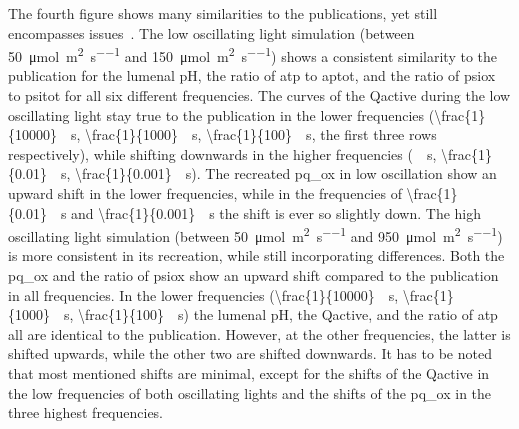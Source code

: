 The fourth figure shows many similarities to the publications, yet still encompasses issues~. The low oscillating light simulation (between \qty{50}{\micro\mol\per\square\meter\per\second} and \qty{150}{\micro\mol\per\square\meter\per\second}) shows a consistent similarity to the publication for the lumenal pH, the ratio of \gls{atp} to \gls{aptot}, and the ratio of \gls{psiox} to \gls{psitot} for all six different frequencies. The curves of the \gls{Qactive} during the low oscillating light stay true to the publication in the lower frequencies (\qty[parse-numbers=false]{\frac{1}{10000}}{\per\second}, \qty[parse-numbers=false]{\frac{1}{1000}}{\per\second}, \qty[parse-numbers=false]{\frac{1}{100}}{\per\second}, the first three rows respectively), while shifting downwards in the higher frequencies (\qty[parse-numbers=false]{}{\per\second}, \qty[parse-numbers=false]{\frac{1}{0.01}}{\per\second}, \qty[parse-numbers=false]{\frac{1}{0.001}}{\per\second}). The recreated \gls{pq_ox} in low oscillation show an upward shift in the lower frequencies, while in the frequencies of \qty[parse-numbers=false]{\frac{1}{0.01}}{\per\second} and \qty[parse-numbers=false]{\frac{1}{0.001}}{\per\second} the shift is ever so slightly down. The high oscillating light simulation (between \qty{50}{\micro\mol\per\square\meter\per\second} and \qty{950}{\micro\mol\per\square\meter\per\second}) is more consistent in its recreation, while still incorporating differences. Both the \gls{pq_ox} and the ratio of \gls{psiox} show an upward shift compared to the publication in all frequencies. In the lower frequencies (\qty[parse-numbers=false]{\frac{1}{10000}}{\per\second}, \qty[parse-numbers=false]{\frac{1}{1000}}{\per\second}, \qty[parse-numbers=false]{\frac{1}{100}}{\per\second}) the lumenal pH, the \gls{Qactive}, and the ratio of \gls{atp} all are identical to the publication. However, at the other frequencies, the latter is shifted upwards, while the other two are shifted downwards. It has to be noted that most mentioned shifts are minimal, except for the shifts of the \gls{Qactive} in the low frequencies of both oscillating lights and the shifts of the \gls{pq_ox} in the three highest frequencies.

